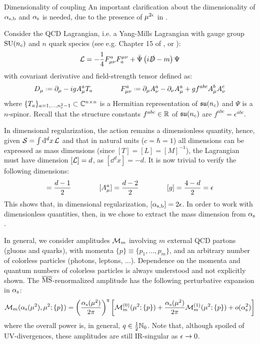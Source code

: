 \begin{observation}{Dimensionality of coupling}{}
  An important clarification about the dimensionality of $ \alpha_\text{s,b} $ and $ \alpha_\text{s} $ is needed, due to the presence of $ \mu^{2\epsilon} $ in .

  Consider the QCD Lagrangian, i.e. a Yang-Mills Lagrangian with gauge group $ \mathrm{SU}(n_c) $ and $ n $ quark species (see e.g. Chapter 15 of \cite{Weinberg-1996}, or ):
  \begin{equation}
    \mathcal{L} = - \frac{1}{4} F_{\mu \nu}^a F^{\mu \nu}_a + \bar{\Psi} \left( i \slashed{D} - m \right) \Psi
  \end{equation}
  with covariant derivative and field-strength tensor defined as:
  \begin{equation}
    D_\mu \defeq \pa_\mu - i g A_\mu^a T_a
    \qquad \qquad
    F_{\mu \nu}^a \defeq \pa_\mu A_\nu^a - \pa_\nu A_\mu^a + g f^{abc} A_\mu^b A_\nu^c
    \label{eq:cov-der-field-str}
  \end{equation}
  where $ \{T_a\}_{a = 1, \dots, n_c^2 - 1} \subset \mathbb{C}^{n \times n} $ is a Hermitian representation of $ \mathfrak{su}(n_c) $ and $ \Psi $ is a $ n $-spinor. Recall that the structure constants $ f^{abc} \in \mathbb{R} $ of $ \mathfrak{su}(n_c) $ are $ f^{abc} = \epsilon^{abc} $.

  In dimensional regularization, the action remains a dimensionless quantity, hence, given $ \mathcal{S} = \int \mathrm{d}^dx \, \mathcal{L} $ and that in natural units ($ c = \hbar = 1 $) all dimensions can be expressed as mass dimensions (since $ [T] = [L] = [M]^{-1} $), the Lagrangian must have dimension $ [\mathcal{L}] = d $, as $ [\dd^dx] = -d $. It is now trivial to verify the following dimensions:
  \begin{equation*}
    [\Psi] = \frac{d - 1}{2}
    \qquad \qquad
    [A_\mu^a] = \frac{d - 2}{2}
    \qquad \qquad
    [g] = \frac{4 - d}{2} = \de
  \end{equation*}
  This shows that, in dimensional regularization, $ [\alpha_\text{s,b}] = 2\epsilon $. In order to work with dimensionless quantities, then, in  we chose to extract the mass dimension from $ \alpha_\text{s} $.
\end{observation}

In general, we consider amplitudes $ \mathcal{M}_m $ involving $ m $ external QCD partons (gluons and quarks), with momenta $ \{p\} \equiv \{p_1, \dots, p_m\} $, and an arbitrary number of colorless particles (photons, leptons, ...). Dependence on the momenta and quantum numbers of colorless particles is always understood and not explicitly shown. The $ \overline{\text{MS}} $-renormalized amplitude has the following perturbative expansion in $ \alpha_\text{s} $:
\begin{equation}
  \mathcal{M}_m(\alpha_\text{s}(\mu^2), \mu^2 ; \{p\}) = \left( \frac{\alpha_\text{s}(\mu^2)}{2\pi} \right)^q \left[ \mathcal{M}_m^{(0)}(\mu^2 ; \{p\}) + \frac{\alpha_\text{s}(\mu^2)}{2\pi} \mathcal{M}_m^{(1)}(\mu^2 ; \{p\}) + o(\alpha_\text{s}^2) \right]
\end{equation}
where the overall power is, in general, $ q \in \frac{1}{2} \mathbb{N}_0 $. Note that, although spoiled of UV-divergences, these amplitudes are still IR-singular as $ \epsilon \rightarrow 0 $.

